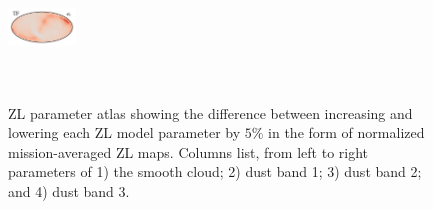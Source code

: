\documentclass[twocolumn]{aa}
\begin{document}
\begin{figure}
{    \includegraphics[height=1cm]{figs/atlas/TF_08.pdf}%
    }\\
    \\
    \\
    \caption{ZL parameter atlas showing the difference between increasing 
    and lowering each ZL model parameter by $5\%$ in the form of normalized 
    mission-averaged ZL maps. Columns list, from left to right parameters of
    1) the smooth cloud; 2) dust band 1; 3) dust band 2; and 4) dust band 3.}
    \label{fig:atlas2}
\end{figure}
\end{document}
